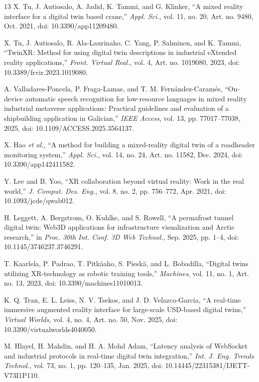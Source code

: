 \documentclass[conference]{IEEEtran}
\begin{document}
\balance
\begin{thebibliography}{13}
X. Tu, J. Autiosalo, A. Jadid, K. Tammi, and G. Klinker, ``A mixed reality interface for a digital twin based crane,'' \emph{Appl. Sci.}, vol. 11, no. 20, Art. no. 9480, Oct. 2021, doi: 10.3390/app11209480.

X. Tu, J. Autiosalo, R. Ala-Laurinaho, C. Yang, P. Salminen, and K. Tammi, ``TwinXR: Method for using digital twin descriptions in industrial eXtended reality applications,'' \emph{Front. Virtual Real.}, vol. 4, Art. no. 1019080, 2023, doi: 10.3389/frvir.2023.1019080.

A. Valladares-Poncela, P. Fraga-Lamas, and T. M. Fern\'andez-Caram\'es, ``On-device automatic speech recognition for low-resource languages in mixed reality industrial metaverse applications: Practical guidelines and evaluation of a shipbuilding application in Galician,'' \emph{IEEE Access}, vol. 13, pp. 77017--77038, 2025, doi: 10.1109/ACCESS.2025.3564137.

X. Hao \emph{et al.}, ``A method for building a mixed-reality digital twin of a roadheader monitoring system,'' \emph{Appl. Sci.}, vol. 14, no. 24, Art. no. 11582, Dec. 2024, doi: 10.3390/app142411582.

Y. Lee and B. Yoo, ``XR collaboration beyond virtual reality: Work in the real world,'' \emph{J. Comput. Des. Eng.}, vol. 8, no. 2, pp. 756--772, Apr. 2021, doi: 10.1093/jcde/qwab012.

H. Leggett, A. Bergstrom, O. Kuhlke, and S. Rowell, ``A permafrost tunnel digital twin: Web3D applications for infrastructure visualization and Arctic research,'' in \emph{Proc. 30th Int. Conf. 3D Web Technol.}, Sep. 2025, pp. 1--4, doi: 10.1145/3746237.3746291.

T. Kaarlela, P. Padrao, T. Pitk\"aaho, S. Piesk\"a, and L. Bobadilla, ``Digital twins utilizing XR-technology as robotic training tools,'' \emph{Machines}, vol. 11, no. 1, Art. no. 13, 2023, doi: 10.3390/machines11010013.

K. Q. Tran, E. L. Leiss, N. V. Tsekos, and J. D. Velazco-Garcia, ``A real-time immersive augmented reality interface for large-scale USD-based digital twins,'' \emph{Virtual Worlds}, vol. 4, no. 4, Art. no. 50, Nov. 2025, doi: 10.3390/virtualworlds4040050.

M. Hlayel, H. Mahdin, and H. A. Mohd Adam, ``Latency analysis of WebSocket and industrial protocols in real-time digital twin integration,'' \emph{Int. J. Eng. Trends Technol.}, vol. 73, no. 1, pp. 120--135, Jan. 2025, doi: 10.14445/22315381/IJETT-V73I1P110.


\end{thebibliography}
\end{document}
